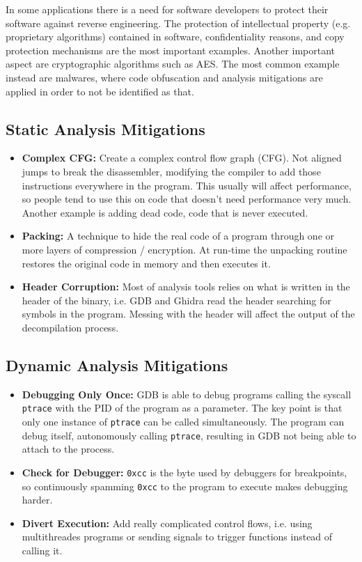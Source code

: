 \documentclass{article}
\begin{document}
In some applications there is a need for software developers to protect their software against reverse engineering. 
The protection of intellectual property (e.g. proprietary algorithms) contained in software, confidentiality reasons, 
and copy protection mechanisms are the most important examples. Another important aspect are cryptographic algorithms 
such as AES. \citep{codeobf} The most common example instead are malwares, where code obfuscation and analysis
mitigations are applied in order to not be identified as that.

\subsection{Static Analysis Mitigations}

\begin{itemize}
\item{\textbf{Complex CFG:}} Create a complex control flow graph (CFG). Not aligned jumps to break the disassembler, 
modifying the compiler to add those instructions everywhere in the program. This usually will affect 
performance, so people tend to use this on code that doesn’t need performance very much. Another example is adding 
dead code, code that is never executed.
\item{\textbf{Packing:}} A technique to hide the real code of a program through one or more layers of compression / 
encryption. At run-time the unpacking routine restores the original code in memory and then executes it.
\item{\textbf{Header Corruption:}} Most of analysis tools relies on what is written in the header of the binary,
i.e. GDB and Ghidra read the header searching for symbols in the program. Messing with the header will affect the
output of the decompilation process.
\end{itemize}

\subsection{Dynamic Analysis Mitigations}

\begin{itemize}
\item{\textbf{Debugging Only Once:}} GDB is able to debug programs calling the syscall \texttt{ptrace} with the PID of
the program as a parameter. The key point is that only one instance of \texttt{ptrace} can be called simultaneously. 
The program can debug itself, autonomously calling \texttt{ptrace}, resulting in GDB not being able to attach to 
the process.
\item{\textbf{Check for Debugger:}} \texttt{0xcc} is the byte used by debuggers for breakpoints, so continuously
spamming \texttt{0xcc} to the program to execute makes debugging harder.
\item{\textbf{Divert Execution:}} Add really complicated control flows, i.e. using multithreades programs or 
sending signals to trigger functions instead of calling it.
\end{itemize}

\pagebreak



\end{document}

